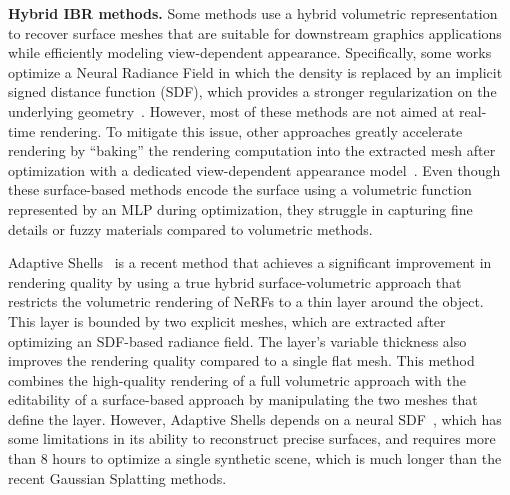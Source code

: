 \noindent
\textbf{Hybrid IBR methods.} Some methods use a hybrid volumetric representation to recover surface meshes that are suitable for downstream graphics applications while efficiently modeling view-dependent appearance. 
%
Specifically, some works optimize a Neural Radiance Field in which the density is replaced by an implicit signed distance function (SDF), which provides a stronger regularization on the underlying geometry~\cite{oechsle2021unisurf,yariv2021volsdf,wang2021neus,li-cvpr2023-neuralangelo,darmon-2022-warp,bao-2022-neumesh}. However, most of these methods are not aimed at real-time rendering.
To mitigate this issue, other approaches greatly accelerate rendering by ``baking'' the rendering computation into the extracted mesh after optimization with a dedicated view-dependent appearance model~\cite{chen2022mobilenerf,yariv-2023-bakedsdf,reiser2024binaryopacitygrid}. 
%
Even though these surface-based methods encode the surface using a volumetric function represented by an MLP during optimization, they struggle in capturing fine details or fuzzy materials compared to volumetric methods.

Adaptive Shells~\cite{wang-siggraphasia2023-adaptive-shells} is a recent method that achieves a significant improvement in rendering quality by using a true hybrid surface-volumetric approach that restricts the volumetric rendering of NeRFs to a thin layer around the object. This layer is bounded by two explicit meshes, which are extracted after optimizing an SDF-based radiance field. The layer’s variable thickness also improves the rendering quality compared to a single flat mesh. This method combines the high-quality rendering of a full volumetric approach with the editability of a surface-based approach by manipulating the two meshes that define the layer. However, Adaptive Shells depends on a neural SDF~\cite{wang2021neus}, which has some limitations in its ability to reconstruct precise surfaces, and requires more than 8 hours to optimize a single synthetic scene, which is much longer than the recent Gaussian Splatting methods. 

